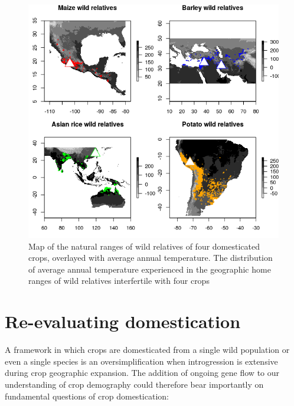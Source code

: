 \documentclass[11pt]{article}
\begin{document}

\begin{figure}[b]
	\centering
	\includegraphics[width=17.35cm]{temperature_plot.png}
	\caption{Map of the natural ranges of wild relatives of four domesticated crops, overlayed with average annual temperature. The distribution of average annual temperature experienced in the geographic home ranges of wild relatives interfertile with four crops}
	\label{fig:map}
\end{figure}


\section*{Re-evaluating domestication}

A framework in which crops are domesticated from a single wild population or even a single species is an oversimplification when introgression is extensive during crop geographic expansion.
The addition of ongoing gene flow to our understanding of crop demography could therefore bear importantly on fundamental questions of crop domestication:
\end{document}
